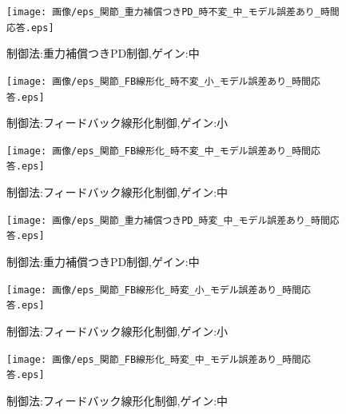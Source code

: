 \documentclass[a4paper,11pt,titlepage]{jsarticle}
\begin{document}
{\begin{figure}[H]
  \begin{center}
    \texttt{[image: 画像/eps\_関節\_重力補償つきPD\_時不変\_中\_モデル誤差あり\_時間応答.eps]}
    \caption{制御法:重力補償つきPD制御,ゲイン:中}
    \label{有/不変/PDG/ゲイン中}
  \end{center}
\end{figure}

\begin{figure}[H]
  \begin{center}
    \texttt{[image: 画像/eps\_関節\_FB線形化\_時不変\_小\_モデル誤差あり\_時間応答.eps]}
    \caption{制御法:フィードバック線形化制御,ゲイン:小}
    \label{有/不変/FB/ゲイン小}
  \end{center}
\end{figure}

\begin{figure}[H]
  \begin{center}
    \texttt{[image: 画像/eps\_関節\_FB線形化\_時不変\_中\_モデル誤差あり\_時間応答.eps]}
    \caption{制御法:フィードバック線形化制御,ゲイン:中}
    \label{有/不変/FB/ゲイン中}
  \end{center}
\end{figure}

\begin{figure}[H]
  \begin{center}
    \texttt{[image: 画像/eps\_関節\_重力補償つきPD\_時変\_中\_モデル誤差あり\_時間応答.eps]}
    \caption{制御法:重力補償つきPD制御,ゲイン:中}
    \label{有/変/PDG/ゲイン中}
  \end{center}
\end{figure}

\begin{figure}[H]
  \begin{center}
    \texttt{[image: 画像/eps\_関節\_FB線形化\_時変\_小\_モデル誤差あり\_時間応答.eps]}
    \caption{制御法:フィードバック線形化制御,ゲイン:小}
    \label{有/変/FB/ゲイン小}
  \end{center}
\end{figure}


\begin{figure}[H]
  \begin{center}
    \texttt{[image: 画像/eps\_関節\_FB線形化\_時変\_中\_モデル誤差あり\_時間応答.eps]}
    \caption{制御法:フィードバック線形化制御,ゲイン:中}
    \label{有/変/FB/ゲイン中}
  \end{center}
\end{figure}

}
\end{document}
